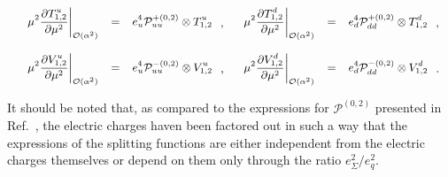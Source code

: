 \begin{widetext}
\begin{equation}
\small
\begin{array}{ll}
\begin{array}{rcl}
\displaystyle \left.\mu^2\frac{\partial T^u_{1,2}}{\partial \mu^2}\right|_{\mathcal{O}(\alpha^2)} &=&
\displaystyle e_u^4\mathcal{P}_{uu}^{+(0,2)}\otimes T^u_{1,2}
\end{array}\,, &
\begin{array}{rcl}
\displaystyle \left.\mu^2\frac{\partial T^d_{1,2}}{\partial \mu^2}\right|_{\mathcal{O}(\alpha^2)} &=&
\displaystyle e_d^4\mathcal{P}_{dd}^{+(0,2)} \otimes T^d_{1,2}
\end{array}\,,
\\
\\
\begin{array}{rcl}
\displaystyle \left.\mu^2\frac{\partial V^u_{1,2}}{\partial \mu^2}\right|_{\mathcal{O}(\alpha^2)} &=&
\displaystyle e_u^4\mathcal{P}_{uu}^{-(0,2)} \otimes V^u_{1,2}
\end{array}\,, &
\begin{array}{rcl}
\displaystyle \left.\mu^2\frac{\partial V^d_{1,2}}{\partial \mu^2}\right|_{\mathcal{O}(\alpha^2)} &=&
\displaystyle e_d^4\mathcal{P}_{dd}^{-(0,2)}\otimes V^d_{1,2}
\end{array}\,.
\end{array}
\end{equation}
\end{widetext}
It should be noted that, as compared to the expressions for
$\mathcal{P}^{(0,2)}$ presented in Ref.~\cite{deFlorian:2016gvk}, the
electric charges haven been factored out in such a way that the
expressions of the splitting functions are either independent from the
electric charges themselves or depend on them only through the ratio
$e_\Sigma^2/e_q^2$.

